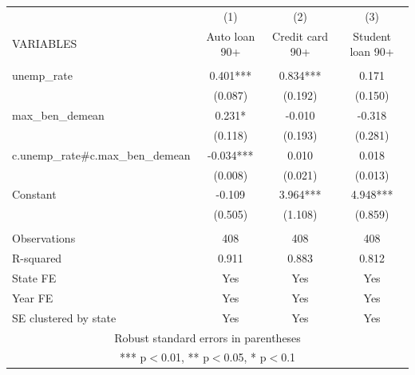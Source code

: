 \documentclass[]{article}
\begin{document}
\begin{tabular}{lccc} \hline
 & (1) & (2) & (3) \\
VARIABLES & Auto loan 90+ & Credit card 90+ & Student loan 90+ \\ \hline
 &  &  &  \\
unemp\_rate & 0.401*** & 0.834*** & 0.171 \\
 & (0.087) & (0.192) & (0.150) \\
max\_ben\_demean & 0.231* & -0.010 & -0.318 \\
 & (0.118) & (0.193) & (0.281) \\
c.unemp\_rate\#c.max\_ben\_demean & -0.034*** & 0.010 & 0.018 \\
 & (0.008) & (0.021) & (0.013) \\
Constant & -0.109 & 3.964*** & 4.948*** \\
 & (0.505) & (1.108) & (0.859) \\
 &  &  &  \\
Observations & 408 & 408 & 408 \\
R-squared & 0.911 & 0.883 & 0.812 \\
State FE & Yes & Yes & Yes \\
Year FE & Yes & Yes & Yes \\
 SE clustered by state & Yes & Yes & Yes \\ \hline
\multicolumn{4}{c}{ Robust standard errors in parentheses} \\
\multicolumn{4}{c}{ *** p$<$0.01, ** p$<$0.05, * p$<$0.1} \\
\end{tabular}
\end{document}
